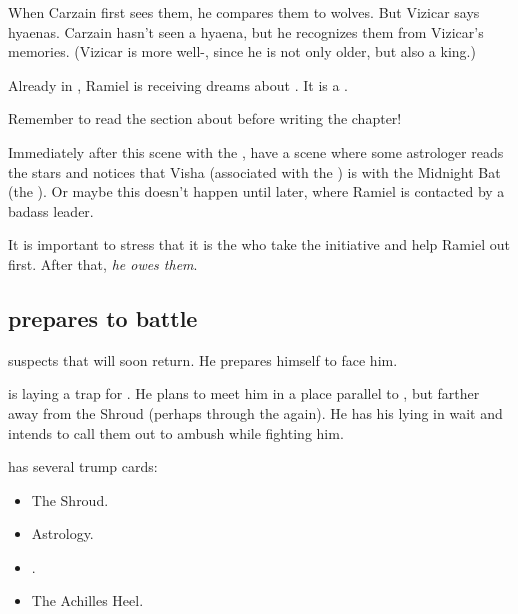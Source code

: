 When Carzain first sees them, he compares them to wolves. But Vizicar says hyaenas. Carzain hasn't seen a hyaena, but he recognizes them from Vizicar's memories. (Vizicar is more well-\travelled, since he is not only older, but also a king.)

Already in \TwilightAngelRememberEmph, Ramiel is receiving dreams about \vorcanths. 
It is a . 

Remember to read the section about  before writing the chapter!

Immediately after this scene with the \vorcanth{}, have a scene where some astrologer reads the stars and notices that Visha (associated with the ) is  with the Midnight Bat (the ). 
Or maybe this doesn't happen until later, where Ramiel is contacted by a badass \vorcanth{} leader. 

It is important to stress that it is the \vorcanths{} who take the initiative and help Ramiel out first. After that, \emph{he owes them}. 









\subsection{\Teshrial prepares to battle \Ishnaruchaefir}
\Teshrial{} suspects that \Ishnaruchaefir{} will soon return. 
He prepares himself to face him. 

\Teshrial{} is laying a trap for \Ishnaruchaefir. 
He plans to meet him in a place parallel to \Malcur, but farther away from the Shroud (perhaps through the  again). 
He has his \noggyaleth{} lying in wait and intends to call them out to ambush \Ishnaruchaefir{} while fighting him. 

\Teshrial{} has several trump cards:
\begin{itemize}
  \item The Shroud.
  \item Astrology. 
  \item \Noggyaleth.
  \item The Achilles Heel. 
\end{itemize}





